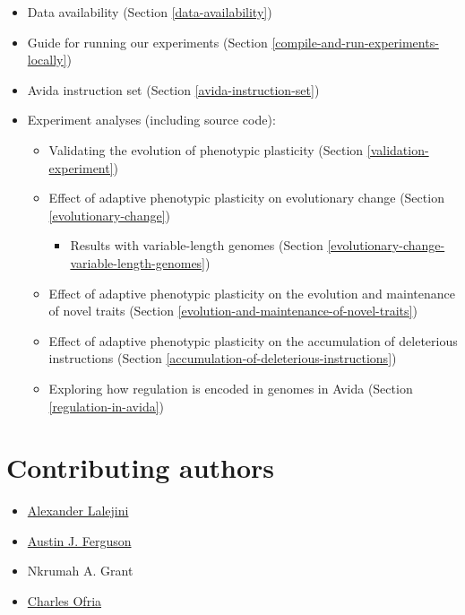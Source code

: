 \documentclass[]{book}
\providecommand{\tightlist}{%
  \setlength{\itemsep}{0pt}\setlength{\parskip}{0pt}}
\begin{document}
\begin{itemize}
\tightlist
\item
  Data availability (Section \ref{data-availability})
\item
  Guide for running our experiments (Section \ref{compile-and-run-experiments-locally})
\item
  Avida instruction set (Section \ref{avida-instruction-set})
\item
  Experiment analyses (including source code):

  \begin{itemize}
  \tightlist
  \item
    Validating the evolution of phenotypic plasticity (Section \ref{validation-experiment})
  \item
    Effect of adaptive phenotypic plasticity on evolutionary change (Section \ref{evolutionary-change})

    \begin{itemize}
    \tightlist
    \item
      Results with variable-length genomes (Section \ref{evolutionary-change-variable-length-genomes})
    \end{itemize}
  \item
    Effect of adaptive phenotypic plasticity on the evolution and maintenance of novel traits (Section \ref{evolution-and-maintenance-of-novel-traits})
  \item
    Effect of adaptive phenotypic plasticity on the accumulation of deleterious instructions (Section \ref{accumulation-of-deleterious-instructions})
  \item
    Exploring how regulation is encoded in genomes in Avida (Section \ref{regulation-in-avida})
  \end{itemize}
\end{itemize}

\hypertarget{contributing-authors}{%
\section{Contributing authors}\label{contributing-authors}}

\begin{itemize}
\tightlist
\item
  \href{https://lalejini.com/}{Alexander Lalejini}
\item
  \href{http://austinjferguson.com/}{Austin J. Ferguson}
\item
  Nkrumah A. Grant
\item
  \href{https://ofria.com/}{Charles Ofria}
\end{itemize}
\end{document}
